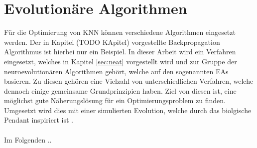 \section{Evolutionäre Algorithmen}
\label{sec:evolutionary_algos}
Für die Optimierung von \ac{KNN} können verschiedene Algorithmen eingesetzt werden. Der in Kapitel (TODO KApitel) vorgestellte Backpropagation Algorithmus ist hierbei nur ein Beispiel. In dieser Arbeit wird ein Verfahren eingesetzt, welches in Kapitel \ref{sec:neat} vorgestellt wird und zur Gruppe der neuroevolutionären Algorithmen gehört, welche auf den sogenannten \acp{EA} basieren. Zu diesen gehören eine Vielzahl von unterschiedlichen Verfahren, welche dennoch einige gemeinsame Grundprinzipien haben. Ziel von diesen ist, eine möglichst gute Näherungslösung für ein Optimierungsproblem zu finden. Umgesetzt wird dies mit einer simulierten Evolution, welche durch das biolgische Pendant inspiriert ist \cite{weicker2015evolutionare}.
\\\\
Im Folgenden .. 


